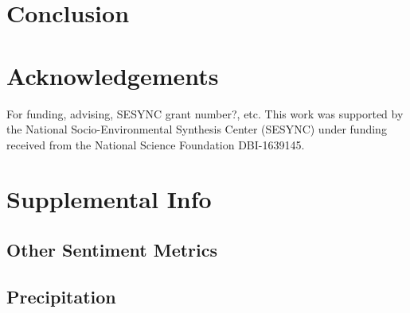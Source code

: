 \documentclass{article}
\begin{document}




\section{Conclusion}

\section{Acknowledgements}
For funding, advising, SESYNC grant number?, etc.
This work was supported by the National Socio-Environmental Synthesis Center (SESYNC) under funding received from the National Science Foundation DBI-1639145.

\printbibliography

\section*{Supplemental Info}
\setcounter{table}{0}
\setcounter{figure}{0}
\setcounter{section}{0}
\renewcommand{\thetable}{S\arabic{table}}
\renewcommand{\thefigure}{S\arabic{figure}}
\renewcommand{\thesection}{S\arabic{section}}

\subsection{Other Sentiment Metrics}

\subsection{Precipitation}






    
\end{document}
